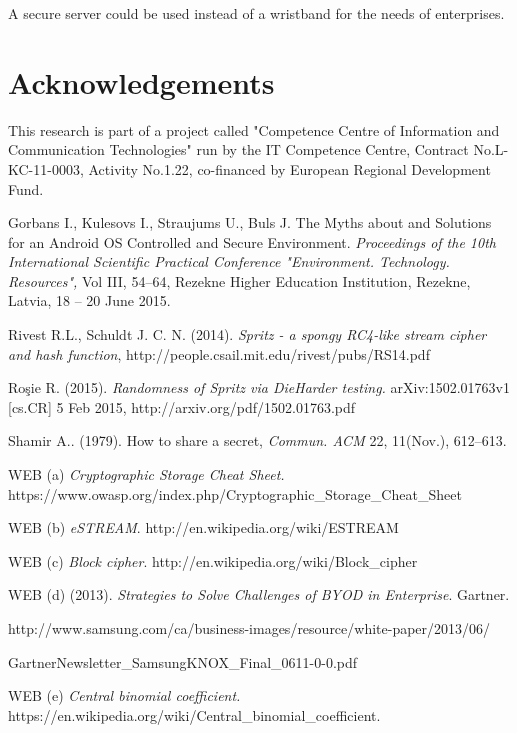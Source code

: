 \documentclass{bjmc}
\begin{document}
A secure server could be used instead of a wristband for the needs of enterprises.

\section{Acknowledgements}

This research is part of a project called "Competence Centre of Information and Communication Technologies" run by the IT Competence Centre, 
Contract No.L-KC-11-0003, Activity No.1.22, co-financed by European Regional Development Fund.





\begin{thebibliography}{}		
  Gorbans I.,  Kulesovs I.,  Straujums U.,  Buls J.  The Myths about and Solutions for an Android OS Controlled
and Secure Environment. \textit{Proceedings of the 10th International Scientific Practical Conference
"Environment. Technology. Resources",}  Vol III, 54--64, Rezekne Higher Education Institution,  
Rezekne, Latvia, 18 -- 20 June 2015.

  Rivest R.L.,  Schuldt J. C. N. (2014).
\textit{ Spritz - a spongy RC4-like stream cipher and hash function},   {\ttfamily http://people.csail.mit.edu/rivest/pubs/RS14.pdf}

  Ro\c sie R. (2015). \textit{ Randomness of Spritz via DieHarder testing.}
arXiv:1502.01763v1 [cs.CR] 5 Feb 2015, {\ttfamily http://arxiv.org/pdf/1502.01763.pdf}

  Shamir A.. (1979). {How to share a secret}, \textit{Commun. ACM} 22, 11(Nov.), 612--613.

 WEB (a) \textit{Cryptographic Storage  Cheat Sheet.} \\
  {\ttfamily https://www.owasp.org/index.php/Cryptographic\_Storage\_Cheat\_Sheet}

 WEB (b) \textit{ eSTREAM}.  {\ttfamily http://en.wikipedia.org/wiki/ESTREAM}

 WEB (c) \textit{ Block cipher}. {\ttfamily  http://en.wikipedia.org/wiki/Block\_cipher}

 WEB (d) (2013). \textit{ Strategies to Solve Challenges of BYOD in Enterprise}. Gartner.\\
{\ttfamily http://www.samsung.com/ca/business-images/resource/white-paper/2013/06/\par
GartnerNewsletter\_SamsungKNOX\_Final\_0611-0-0.pdf}

 WEB (e) \textit{Central binomial coefficient.} \\ {\ttfamily https://en.wikipedia.org/wiki/Central\_binomial\_coefficient.}

\end{thebibliography}
\end{document}
